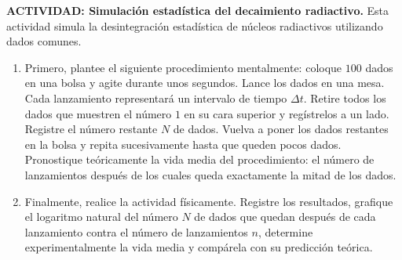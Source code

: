 \item \textbf{ACTIVIDAD: Simulación estadística del decaimiento radiactivo.}
Esta actividad simula la desintegración estadística de núcleos radiactivos utilizando dados comunes.
\begin{enumerate}
    \item Primero, plantee el siguiente procedimiento mentalmente: coloque $100$ dados en una bolsa y agite durante unos segundos. Lance los dados en una mesa. Cada lanzamiento representará un intervalo de tiempo $\Delta t$. Retire todos los dados que muestren el número $1$ en su cara superior y regístrelos a un lado. Registre el número restante $N$ de dados. Vuelva a poner los dados restantes en la bolsa y repita sucesivamente hasta que queden pocos dados. Pronostique teóricamente la vida media del procedimiento: el número de lanzamientos después de los cuales queda exactamente la mitad de los dados.
    \item Finalmente, realice la actividad físicamente. Registre los resultados, grafique el logaritmo natural del número $N$ de dados que quedan después de cada lanzamiento contra el número de lanzamientos $n$, determine experimentalmente la vida media y compárela con su predicción teórica.
\end{enumerate}